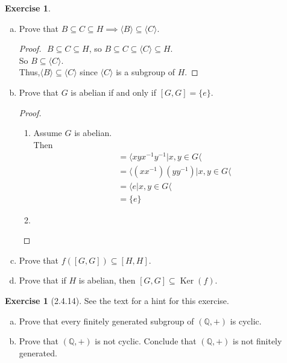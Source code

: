\documentclass{amsart}
\newcommand{\bbq}{\mathbb{Q}}
\renewcommand{\ker}{\operatorname{Ker}}
\theoremstyle{plain}
\theoremstyle{definition}
\newtheorem{exer}[lem]{Exercise}
\begin{document}
\begin{exer}
\begin{enumerate}[(a)]
\begin{proof}
		\begin{align*}
			f(x) &= f(a_1^{\epsilon_1}a_2^{\epsilon_2}...a_n^{\epsilon_n}) \\
				 	  &= {f(a_1)}^{\epsilon_1} {f(a_2)}^{\epsilon_2}...{f(a_n)}^{\epsilon_n}\\
				 	  & \in f(A) \subseteq \langle f(A)\rangle
		\end{align*}
		since $f$ is a homomorphism and $f(a_1)^{\epsilon_1},f(a_2)^{\epsilon_2},...,f(a_n)^{\epsilon_n} \in f(A)$.\\
		So we have 
		$$f(\langle A \rangle) \subseteq \langle f(A)\rangle.$$
		Since both of $f(\langle A\rangle)$ and $\langle f(A) \rangle$ are subgroups of $H$,\\
		$f(\langle A\rangle)=\langle f(A)\rangle$
	\end{proof}
\item Prove that $B\subseteq C\subseteq H\implies \langle B\rangle\subseteq\langle C\rangle$.
	\begin{proof}
		$ $\newline
		$B \subseteq C \subseteq H$, so $B\subseteq C \subseteq \langle C \rangle \subseteq H$.\\
		So $B\subseteq \langle C \rangle$.\\
		Thus,$\langle B \rangle \subseteq \langle C \rangle$ since $\langle C \rangle$ is a subgroup of $H$.
	\end{proof}

\item Prove that $G$ is abelian if and only if $[G,G]=\{e\}$.
	\begin{proof}
		$ $\newline
		\begin{enumerate}
			\item 
				Assume $G$ is abelian.\\
				Then 
				\begin{align*}
				[G,G] &= \langle xyx^{-1}y^{-1} |x,y \in G\langle \\
			    	  &= \langle (xx^{-1})(yy^{-1}) |x,y \in G \langle \\
			    	  &= \langle e |x,y \in G \langle \\
			    	  & = \{e\}
				\end{align*}	
			\item
		\end{enumerate}
	\end{proof}
\item Prove that $f([G,G])\subseteq[H,H]$.
\item Prove that if   $H$ is abelian, then $[G,G]\subseteq\ker(f)$.
\end{enumerate}
\end{exer}

\begin{exer}[2.4.14]
See the text for a hint for this exercise.
\begin{enumerate}[(a)]
\item Prove that every finitely generated subgroup of $(\bbq,+)$ is cyclic.
\item Prove that $(\bbq,+)$ is not cyclic.
Conclude that $(\bbq,+)$ is not finitely generated.
\end{enumerate}
\end{exer}
\end{document}
